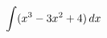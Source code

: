 \documentclass[preview]{standalone}
\begin{document}
\begin{align*}
\special{dvisvgm:raw <g id='unique000'>}\int (x^3-3x^2+4)\,dx\special{dvisvgm:raw </g>}
\end{align*}
\end{document}
